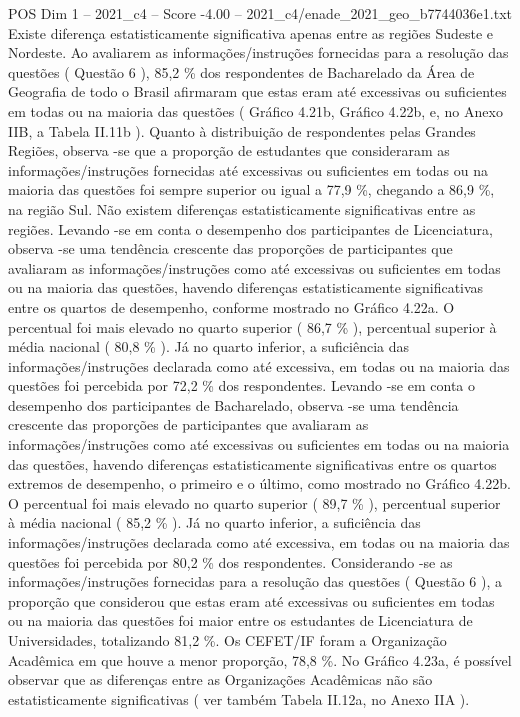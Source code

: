 \begin{textsample}{POS Dim 1 – 2021\_c4 – Score -4.00 – 2021\_c4/enade\_2021\_geo\_b7744036e1.txt}
Existe diferença estatisticamente significativa apenas entre as regiões Sudeste e Nordeste.
Ao avaliarem as informações/instruções fornecidas para a resolução das questões ( Questão 6 ), 85,2 \% dos respondentes de Bacharelado da Área de Geografia de todo o Brasil afirmaram que estas eram até excessivas ou suficientes em todas ou na maioria das questões ( Gráfico 4.21b, Gráfico 4.22b, e, no Anexo IIB, a Tabela II.11b ).
Quanto à distribuição de respondentes pelas Grandes Regiões, observa -se que a proporção de estudantes que consideraram as informações/instruções fornecidas até excessivas ou suficientes em todas ou na maioria das questões foi sempre superior ou igual a 77,9 \%, chegando a 86,9 \%, na região Sul.
Não existem diferenças estatisticamente significativas entre as regiões.
Levando -se em conta o desempenho dos participantes de Licenciatura, observa -se uma tendência crescente das proporções de participantes que avaliaram as informações/instruções como até excessivas ou suficientes em todas ou na maioria das questões, havendo diferenças estatisticamente significativas entre os quartos de desempenho, conforme mostrado no Gráfico 4.22a.
O percentual foi mais elevado no quarto superior ( 86,7 \% ), percentual superior à média nacional ( 80,8 \% ).
Já no quarto inferior, a suficiência das informações/instruções declarada como até excessiva, em todas ou na maioria das questões foi percebida por 72,2 \% dos respondentes.
Levando -se em conta o desempenho dos participantes de Bacharelado, observa -se uma tendência crescente das proporções de participantes que avaliaram as informações/instruções como até excessivas ou suficientes em todas ou na maioria das questões, havendo diferenças estatisticamente significativas entre os quartos extremos de desempenho, o primeiro e o último, como mostrado no Gráfico 4.22b.
O percentual foi mais elevado no quarto superior ( 89,7 \% ), percentual superior à média nacional ( 85,2 \% ).
Já no quarto inferior, a suficiência das informações/instruções declarada como até excessiva, em todas ou na maioria das questões foi percebida por 80,2 \% dos respondentes.
Considerando -se as informações/instruções fornecidas para a resolução das questões ( Questão 6 ), a proporção que considerou que estas eram até excessivas ou suficientes em todas ou na maioria das questões foi maior entre os estudantes de Licenciatura de Universidades, totalizando 81,2 \%.
Os CEFET/IF foram a Organização Acadêmica em que houve a menor proporção, 78,8 \%.
No Gráfico 4.23a, é possível observar que as diferenças entre as Organizações Acadêmicas não são estatisticamente significativas ( ver também Tabela II.12a, no Anexo IIA ).

\end{textsample}
